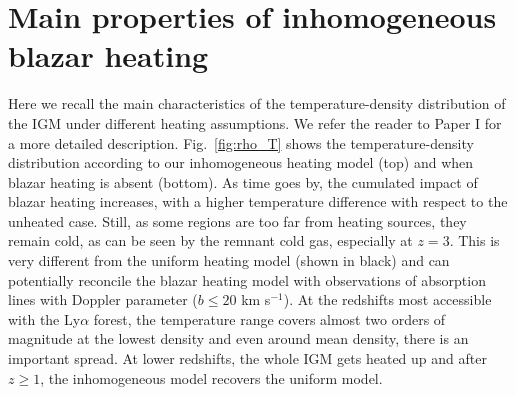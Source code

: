 \documentclass[numberedappendix]{emulateapj}
\begin{document}
\section{Main properties of inhomogeneous blazar heating}\label{sec:biased}

Here we recall the main characteristics of the temperature-density distribution of the IGM under different heating assumptions.   We refer the reader to Paper I for a more detailed description. Fig.~\ref{fig:rho_T} shows the temperature-density distribution according to our inhomogeneous heating model (top) and when blazar heating is absent (bottom). As time goes by, the cumulated impact of blazar heating increases, with a higher temperature difference with respect to the unheated case. Still, as some regions are too far from heating sources, they remain cold, as can be seen by the remnant cold gas, especially at $z=3$. This is very different from the uniform heating model (shown in black) and can potentially reconcile the blazar heating model with observations of absorption lines with Doppler parameter ($b\leq 20$ km s$^{-1}$). At the redshifts most accessible with the Ly$\alpha$ forest, the temperature range  covers almost two orders of magnitude at the lowest density and  even around mean density, there is an important spread. At lower redshifts, the whole IGM gets heated up and after $z\geqslant1$, the inhomogeneous model recovers the uniform model. 
\end{document}
